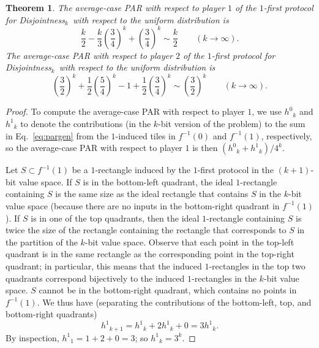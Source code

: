 \documentclass{article}
\theoremstyle{theorem}
\newtheorem{theorem}{Theorem}[section]
\theoremstyle{definition}
\theoremstyle{remark}
\newcommand{\disjoint}{{\sc Dis\-joint\-ness}\ensuremath{_k}}
\newcommand{\shn}{\ensuremath{h^0}}
\newcommand{\shy}{\ensuremath{h^1}}
\begin{document}
\begin{theorem}
The average-case PAR with respect to player $1$ of the $1$-first protocol for \disjoint\ with respect to the uniform distribution is
\[
    \frac{k}{2} - \frac{k}{3}\left(\frac{3}{4}\right)^k + \left(\frac{3}{4}\right)^k \sim \frac{k}{2}\qquad (k\rightarrow\infty).
\]
The average-case PAR with respect to player $2$ of the $1$-first protocol for \disjoint\ with respect to the uniform distribution is
\[
    \left(\frac{3}{2}\right)^k + \frac{1}{2}\left(\frac{5}{4}\right)^k - 1 + \frac{1}{2}\left(\frac{3}{4}\right)^k \sim \left(\frac{3}{2}\right)^k\qquad (k\rightarrow\infty).
\]
\end{theorem}
\begin{proof}
To compute the average-case PAR with respect to player $1$, we use $\shn_k$ and $\shy_k$ to denote the contributions (in the $k$-bit version of the problem) to the sum in Eq.~\ref{eq:pargen} from the $1$-induced tiles in $f^{-1}(0)$ and $f^{-1}(1)$, respectively, so the average-case PAR with respect to player $1$ is then $\left(\shn_k+\shy_k\right)/4^k$.

Let $S\subset f^{-1}(1)$ be a $1$-rectangle induced by the $1$-first protocol in the $(k+1)$-bit value space.  If $S$ is in the bottom-left quadrant, the ideal $1$-rectangle containing $S$ is the same size as the ideal rectangle that contains $S$ in the $k$-bit value space (because there are no inputs in the bottom-right quadrant in $f^{-1}(1)$).  If $S$ is in one of the top quadrants, then the ideal $1$-rectangle containing $S$ is twice the size of the rectangle containing the rectangle that corresponds to $S$ in the partition of the $k$-bit value space.  Observe that each point in the top-left quadrant is in the same rectangle as the corresponding point in the top-right quadrant; in particular, this means that the induced $1$-rectangles in the top two quadrants correspond bijectively to the induced $1$-rectangles in the $k$-bit value space.  $S$ cannot be in the bottom-right quadrant, which contains no points in $f^{-1}(1)$.  We thus have (separating the contributions of the bottom-left, top, and bottom-right quadrants)
\[
\shy_{k+1} = \shy_k + 2\shy_k + 0 = 3\shy_k.
\]
By inspection, $\shy_1 = 1+2+0 = 3$; so $\shy_k = 3^k$.


\end{proof}
\end{document}

